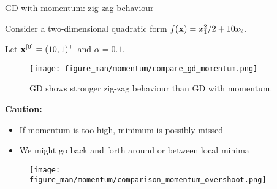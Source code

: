 \documentclass[11pt,compress,t,notes=noshow, xcolor=table]{beamer}
\begin{document}
\begin{vbframe}{GD with momentum: zig-zag behaviour}

Consider a two-dimensional quadratic form $f(\mathbf{x}) = x_1^2/2 + 10 x_2$.

\medskip

Let $\mathbf{x}^{[0]} = (10, 1)^\top$ and $\alpha = 0.1$.

\begin{figure}
    \centering
    \texttt{[image: figure\_man/momentum/compare\_gd\_momentum.png]}
    \caption*{GD shows stronger zig-zag behaviour than GD with momentum.}
\end{figure}

\framebreak

\textbf{Caution:}

\begin{itemize}
    \item If momentum is too high, minimum is possibly missed
    \item We might go back and forth around or between local minima
\end{itemize}

\begin{figure}
    \centering
    \texttt{[image: figure\_man/momentum/comparison\_momentum\_overshoot.png]}
\end{figure}

\end{vbframe}


\end{document}
